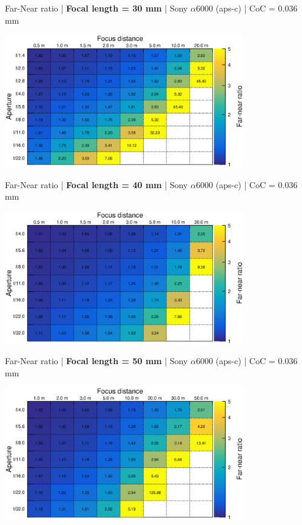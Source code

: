 \documentclass[aspectratio=169]{beamer}
\begin{document}
\begin{frame}[plain]{}
  \vspace{1ex}
  \centering
  Far-Near ratio | {\bf Focal length = 30 mm} |  Sony $\alpha$\hspace{0.1em}6000 (aps-c) | CoC = 0.036 mm
  
  \includegraphics[center,width=0.78\textwidth]{img/far-near-ratio_focl30.eps}
\end{frame}

\begin{frame}[plain]{}
  \vspace{1ex}
  \centering
  Far-Near ratio | {\bf Focal length = 40 mm} |  Sony $\alpha$\hspace{0.1em}6000 (aps-c) | CoC = 0.036 mm
  
  \includegraphics[center,width=0.78\textwidth]{img/far-near-ratio_focl40.eps}
\end{frame}

\begin{frame}[plain]{}
  \vspace{1ex}
  \centering
  Far-Near ratio | {\bf Focal length = 50 mm} |  Sony $\alpha$\hspace{0.1em}6000 (aps-c) | CoC = 0.036 mm
  
  \includegraphics[center,width=0.78\textwidth]{img/far-near-ratio_focl50.eps}
\end{frame}
\end{document}
